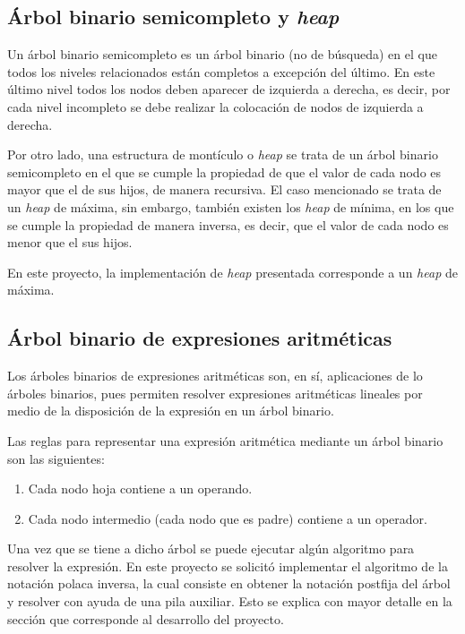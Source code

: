 \documentclass[letterpaper, 11pt]{article}
\begin{document}
	\subsection*{Árbol binario semicompleto y \textit{heap}}
	
	Un árbol binario semicompleto es un árbol binario (no de búsqueda) en el que todos los niveles relacionados están completos a excepción del último. En este último nivel todos los nodos deben aparecer de izquierda a derecha, es decir, por cada nivel incompleto se debe realizar la colocación de nodos de izquierda a derecha.
	
	Por otro lado, una estructura de montículo o \textit{heap} se trata de un árbol binario semicompleto en el que se cumple la propiedad de que el valor de cada nodo es mayor que el de sus hijos, de manera recursiva. El caso mencionado se trata de un \textit{heap} de máxima, sin embargo, también existen los \textit{heap} de mínima, en los que se cumple la propiedad de manera inversa, es decir, que el valor de cada nodo es menor que el sus hijos.
	
	En este proyecto, la implementación de \textit{heap} presentada corresponde a un \textit{heap} de máxima.
	
	\subsection*{Árbol binario de expresiones aritméticas}
	
	Los árboles binarios de expresiones aritméticas son, en sí, aplicaciones de lo árboles binarios, pues permiten resolver expresiones aritméticas lineales por medio de la disposición de la expresión en un árbol binario. 
	
	Las reglas para representar una expresión aritmética mediante un árbol binario son las siguientes:
	
	\begin{enumerate}
		\item Cada nodo hoja contiene a un operando.
		\item Cada nodo intermedio (cada nodo que es padre) contiene a un operador.
	\end{enumerate}

	Una vez que se tiene a dicho árbol se puede ejecutar algún algoritmo para resolver la expresión. En este proyecto se solicitó implementar el algoritmo de la notación polaca inversa, la cual consiste en obtener la notación postfija del árbol y resolver con ayuda de una pila auxiliar. Esto se explica con mayor detalle en la sección que corresponde al desarrollo del proyecto.
	
\end{document}
